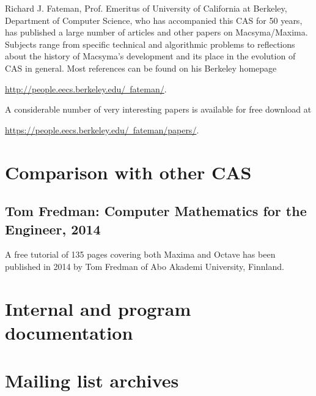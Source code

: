 \documentclass[../Maxima_Workbook.tex]{subfiles}
\begin{document}
Richard J. Fateman, Prof. Emeritus of University of California at Berkeley, Department of Computer Science, who has accompanied this CAS for 50 years, has published a large number of articles and other papers on Macsyma/Maxima. Subjects range from specific technical and algorithmic problems to reflections about the history of Macsyma's development and its place in the evolution of CAS in general. Most references can be found on his Berkeley homepage

\lz \centering \href{http://people.eecs.berkeley.edu/~fateman/}{http://people.eecs.berkeley.edu/~fateman/}. 

\lz A considerable number of very interesting papers is available for free download at

\lz \centering \href{https://people.eecs.berkeley.edu/~fateman/papers/}{https://people.eecs.berkeley.edu/~fateman/papers/}. \flushleft

\section{Comparison with other CAS}

\subsection{Tom Fredman: Computer Mathematics for the Engineer, 2014}
A free tutorial of 135 pages covering both Maxima and Octave has been published in 2014 by Tom Fredman of Abo Akademi University, Finnland. 

\section{Internal and program documentation}

\section{Mailing list archives}
\end{document}

